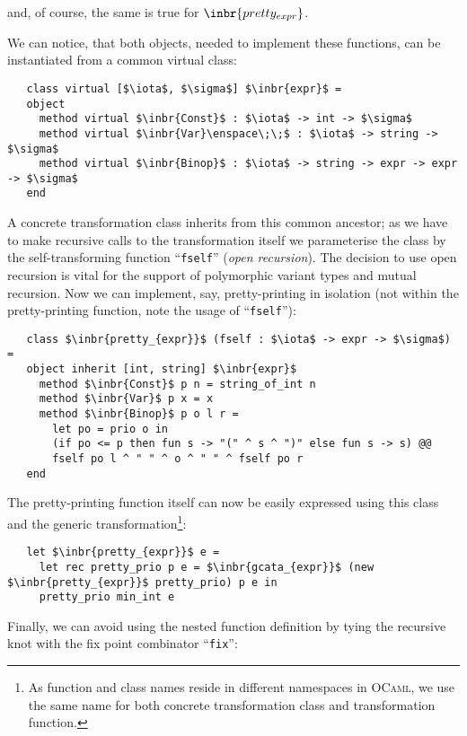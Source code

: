 and, of course, the same is true for $\inbr{pretty_{expr}}$.

We can notice, that both objects, needed to implement these functions, can be instantiated from a common virtual class:

\begin{lstlisting}
   class virtual [$\iota$, $\sigma$] $\inbr{expr}$ =
   object
     method virtual $\inbr{Const}$ : $\iota$ -> int -> $\sigma$
     method virtual $\inbr{Var}\enspace\;\;$ : $\iota$ -> string -> $\sigma$
     method virtual $\inbr{Binop}$ : $\iota$ -> string -> expr -> expr -> $\sigma$  
   end
\end{lstlisting}

A concrete transformation class inherits from this common ancestor; as we have to make recursive calls to the transformation 
itself we parameterise the class by the self-transforming function ``\lstinline{fself}'' (\emph{open recursion}). The decision to
use open recursion is vital for the support of polymorphic variant types and mutual recursion. Now we can implement, say, pretty-printing
in isolation (not within the pretty-printing function, note the usage of ``\lstinline{fself}''):

\begin{lstlisting}
   class $\inbr{pretty_{expr}}$ (fself : $\iota$ -> expr -> $\sigma$) =
   object inherit [int, string] $\inbr{expr}$ 
     method $\inbr{Const}$ p n = string_of_int n
     method $\inbr{Var}$ p x = x
     method $\inbr{Binop}$ p o l r =
       let po = prio o in
       (if po <= p then fun s -> "(" ^ s ^ ")" else fun s -> s) @@
       fself po l ^ " " ^ o ^ " " ^ fself po r
   end
\end{lstlisting}

The pretty-printing function itself can now be easily expressed using this class and the generic transformation\footnote{As function and class names reside in
  different namespaces in \textsc{OCaml}, we use the same name for both concrete transformation class and transformation function.}:

\begin{lstlisting}
   let $\inbr{pretty_{expr}}$ e =
     let rec pretty_prio p e = $\inbr{gcata_{expr}}$ (new $\inbr{pretty_{expr}}$ pretty_prio) p e in
     pretty_prio min_int e
\end{lstlisting}

Finally, we can avoid using the nested function definition by tying the recursive knot with the fix point combinator ``\lstinline{fix}'':

